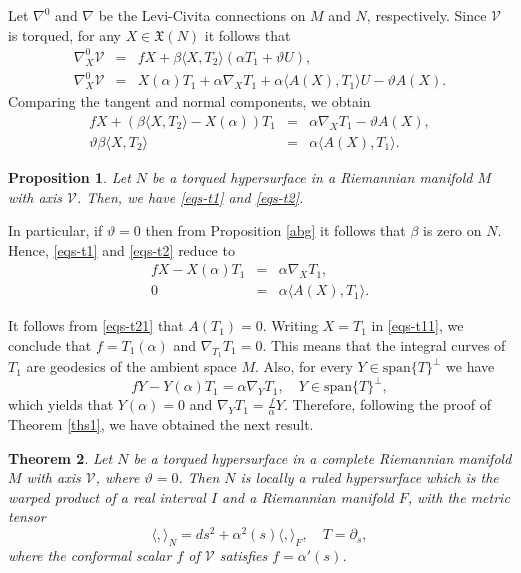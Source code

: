 \documentclass[12pt]{amsart}
\def\v{\mathcal V}
\newtheorem{theorem}{Theorem}[section]
\newtheorem{proposition}[theorem]{Proposition}
\theoremstyle{definition}
\begin{document}
Let $\nabla^0$ and $\nabla$ be the Levi-Civita connections on $M$ and $N$, respectively. Since $\v$ is torqued, for any $X\in \mathfrak{X}(N)$ it follows that
\begin{eqnarray*}
\nabla^0_X\v&=&fX+\beta\langle X,T_2\rangle (\alpha T_1  +\vartheta U), \\ \nabla^0_X\v&=&X(\alpha)T_1+\alpha\nabla_XT_1+\alpha\langle A(X),T_1\rangle U-\vartheta A(X).
\end{eqnarray*}
Comparing the tangent and normal components, we obtain
\begin{eqnarray}
fX+(\beta\langle X,T_2\rangle - X(\alpha))T_1&=&\alpha\nabla_XT_1-\vartheta A(X), \label{eqs-t1}\\ 
\vartheta\beta\langle X,T_2\rangle&=&\alpha\langle A(X),T_1\rangle.\label{eqs-t2}
\end{eqnarray}
\begin{proposition}\label{pro-torq}
Let $N$ be a torqued hypersurface in a Riemannian manifold $M$ with axis $\v$. Then, we have  \eqref{eqs-t1} and \eqref{eqs-t2}.
\end{proposition}

In particular, if $\vartheta=0$ then from Proposition \ref{abg} it follows that $\beta$ is zero on $N$. Hence, \eqref{eqs-t1} and \eqref{eqs-t2} reduce to
\begin{eqnarray}
fX- X(\alpha)T_1&=&\alpha\nabla_XT_1, \label{eqs-t11}\\ 
0&=&\alpha\langle A(X),T_1\rangle . \label{eqs-t21}
\end{eqnarray}

It follows from \eqref{eqs-t21} that $A(T_1)=0$. Writing $X=T_1$ in \eqref{eqs-t11}, we conclude that $f=T_1(\alpha)$ and $\nabla_{T_1}T_1=0$. This means that the integral curves of $T_1$ are geodesics of the ambient space $M$. Also, for every $Y \in \mbox{span}\{T\}^{\perp}$ we have
\begin{equation*}
fY-Y(\alpha)T_1=\alpha\nabla_YT_1, \quad Y \in \mbox{span}\{T\}^{\perp}, 
\end{equation*}
which yields that $Y(\alpha)=0$ and $\nabla_YT_1=\frac{f}{\alpha}Y$. Therefore, following the proof of Theorem \ref{ths1}, we have obtained the next result.

\begin{theorem}\label{ths10}
Let $N$ be a torqued hypersurface in a complete Riemannian manifold $M$ with axis $\v$, where $\vartheta=0$. Then $N$ is locally a ruled hypersurface which is the warped product of a real interval $I$ and a Riemannian manifold $F$, with the metric tensor
$$
\langle,\rangle_N=ds^2+\alpha^2(s)\langle,\rangle_F, \quad T=\partial_s,
$$
where the conformal scalar $f$ of $\v$ satisfies $f=\alpha'(s)$.
\end{theorem}
\end{document}
